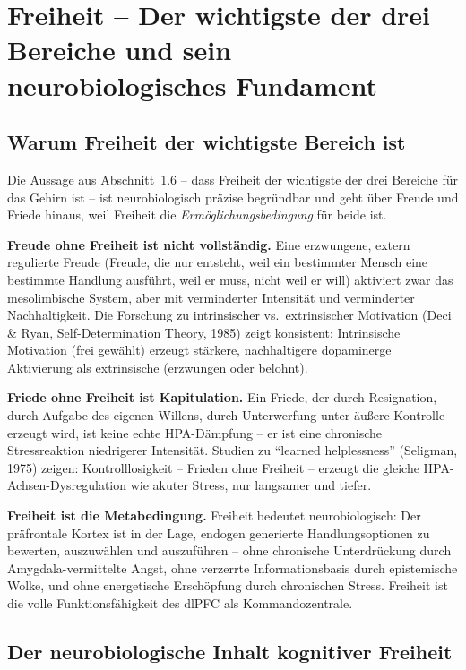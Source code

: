 ﻿\documentclass[12pt,a4paper]{report}
\theoremstyle{plain}
\theoremstyle{definition}
\theoremstyle{remark}
\begin{document}
	\section{Freiheit -- Der wichtigste der drei Bereiche und sein neurobiologisches Fundament}

	\subsection{Warum Freiheit der wichtigste Bereich ist}

	Die Aussage aus Abschnitt~1.6 -- dass Freiheit der wichtigste
	der drei Bereiche für das Gehirn ist -- ist neurobiologisch
	präzise begründbar und geht über Freude und Friede hinaus,
	weil Freiheit die \emph{Ermöglichungsbedingung} für beide ist.

	\textbf{Freude ohne Freiheit ist nicht vollständig.}
	Eine erzwungene, extern regulierte Freude (Freude, die nur entsteht,
	weil ein bestimmter Mensch eine bestimmte Handlung ausführt,
	weil er muss, nicht weil er will) aktiviert zwar das mesolimbische
	System, aber mit verminderter Intensität und verminderter Nachhaltigkeit.
	Die Forschung zu intrinsischer vs.\ extrinsischer Motivation
	(Deci \& Ryan, Self-Determination Theory, 1985) zeigt konsistent:
	Intrinsische Motivation (frei gewählt) erzeugt stärkere, nachhaltigere
	dopaminerge Aktivierung als extrinsische (erzwungen oder belohnt).

	\textbf{Friede ohne Freiheit ist Kapitulation.}
	Ein Friede, der durch Resignation, durch Aufgabe des eigenen Willens,
	durch Unterwerfung unter äußere Kontrolle erzeugt wird,
	ist keine echte HPA-Dämpfung -- er ist eine chronische Stressreaktion
	niedrigerer Intensität. Studien zu ``learned helplessness''
	(Seligman, 1975) zeigen: Kontrolllosigkeit -- Frieden ohne Freiheit --
	erzeugt die gleiche HPA-Achsen-Dysregulation wie akuter Stress,
	nur langsamer und tiefer.

	\textbf{Freiheit ist die Metabedingung.}
	Freiheit bedeutet neurobiologisch: Der präfrontale Kortex
	ist in der Lage, endogen generierte Handlungsoptionen zu bewerten,
	auszuwählen und auszuführen -- ohne chronische Unterdrückung durch
	Amygdala-vermittelte Angst, ohne verzerrte Informationsbasis
	durch epistemische Wolke, und ohne energetische Erschöpfung durch
	chronischen Stress. Freiheit ist die volle Funktionsfähigkeit
	des dlPFC als Kommandozentrale.

	\subsection{Der neurobiologische Inhalt kognitiver Freiheit}
\end{document}
